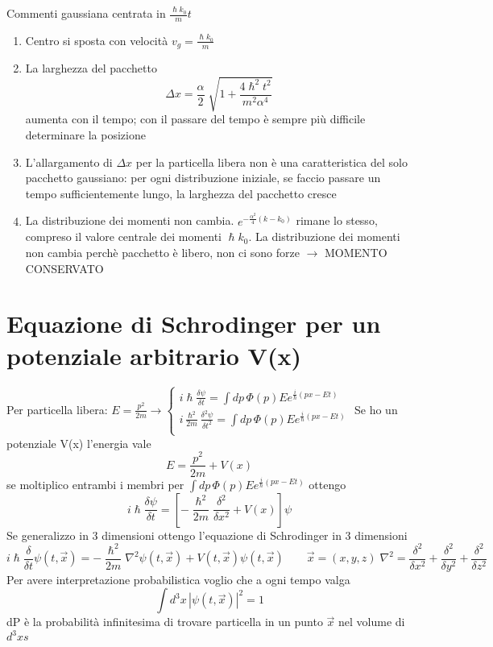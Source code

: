 Commenti gaussiana centrata in $\frac{\hslash k_0}{m}t$
\begin{enumerate}
    \item Centro si sposta con velocità $v_g = \frac{\hslash k_0}{m}$
    \item La larghezza del pacchetto 
    \begin{equation*}
        \Delta x = \frac{\alpha}{2}\sqrt[]{1 + \frac{4\hslash^2 t^2}{m^2\alpha^4}}
    \end{equation*}
    aumenta con il tempo; con il passare del tempo è sempre più difficile determinare la posizione 
    \item L'allargamento  di $\Delta x$ per la particella libera non è una caratteristica del solo pacchetto gaussiano: per ogni distribuzione iniziale, se faccio passare un tempo sufficientemente lungo, la larghezza del pacchetto cresce
    \item La distribuzione dei momenti non cambia. $e^{-\frac{\alpha^2}{4}(k-k_0)}$ rimane lo stesso, compreso il valore centrale dei momenti $\hslash k_0$. La distribuzione dei momenti non cambia perchè pacchetto è libero, non ci sono forze $\rightarrow$ MOMENTO CONSERVATO 
\end{enumerate}

\section{Equazione di Schrodinger per un potenziale arbitrario V(x)}

Per particella libera: $E = \frac{p^2}{2m} \rightarrow
\begin{cases}
    i\hslash \frac{\delta \psi}{\delta t} = \int dp \, \varPhi(p)E e^{\frac{i}{\hslash}(px-Et)} \\
    i\frac{\hslash^2}{2m} \frac{\delta^2 \psi}{\delta t^2} = \int dp \, \varPhi(p)E e^{\frac{i}{\hslash}(px-Et)} \\
\end{cases}$
Se ho un potenziale V(x) l'energia vale
\begin{equation*}
    E = \frac{p^2}{2m} + V(x)
\end{equation*}
se moltiplico entrambi i membri per $\int dp \, \varPhi(p)E e^{\frac{i}{\hslash}(px-Et)}$ ottengo
\begin{equation*}
    i\hslash \frac{\delta \psi}{\delta t} = \left[-\frac{\hslash^2}{2m}\frac{\delta^2}{\delta x^2} + V(x)\right]\psi
\end{equation*}
Se generalizzo in 3 dimensioni ottengo l'equazione di Schrodinger in 3 dimensioni
\begin{equation*}
    i\hslash \frac{\delta}{\delta t} \psi(t,\vec{x}) = -\frac{\hslash^2}{2m}\nabla^2 \psi(t,\vec{x}) + V(t,\vec{x})\psi(t,\vec{x}) \qquad \vec{x} = (x,y,z) \; \nabla^2 = \frac{\delta^2}{\delta x^2} + \frac{\delta^2}{\delta y^2} + \frac{\delta^2}{\delta z^2}
\end{equation*}
Per avere interpretazione probabilistica voglio che a ogni tempo valga 
\begin{equation*}
    \int d^3x \, {|\psi(t,\vec{x})|}^2 = 1
\end{equation*}
dP è la probabilità infinitesima di trovare particella in un punto $\vec{x}$ nel volume di $d^3 xs$

